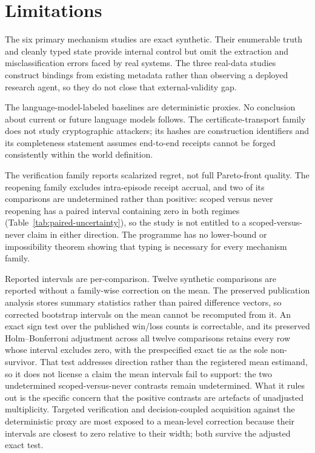 \section{Limitations}

The six primary mechanism studies are exact synthetic. Their enumerable truth and cleanly typed state provide internal control but omit the extraction and misclassification errors faced by real systems. The three real-data studies construct bindings from existing metadata rather than observing a deployed research agent, so they do not close that external-validity gap.

The language-model-labeled baselines are deterministic proxies. No conclusion about current or future language models follows. The certificate-transport family does not study cryptographic attackers; its hashes are construction identifiers and its completeness statement assumes end-to-end receipts cannot be forged consistently within the world definition.

The verification family reports scalarized regret, not full Pareto-front quality. The reopening family excludes intra-episode receipt accrual, and two of its comparisons are undetermined rather than positive: scoped versus never reopening has a paired interval containing zero in both regimes (Table~\ref{tab:paired-uncertainty}), so the study is not entitled to a scoped-versus-never claim in either direction. The programme has no lower-bound or impossibility theorem showing that typing is necessary for every mechanism family.

Reported intervals are per-comparison. Twelve synthetic comparisons are reported without a family-wise correction on the mean. The preserved publication analysis stores summary statistics rather than paired difference vectors, so corrected bootstrap intervals on the mean cannot be recomputed from it. An exact sign test over the published win/loss counts is correctable, and its preserved Holm--Bonferroni adjustment across all twelve comparisons retains every row whose interval excludes zero, with the prespecified exact tie as the sole non-survivor. That test addresses direction rather than the registered mean estimand, so it does not license a claim the mean intervals fail to support: the two undetermined scoped-versus-never contrasts remain undetermined. What it rules out is the specific concern that the positive contrasts are artefacts of unadjusted multiplicity. Targeted verification and decision-coupled acquisition against the deterministic proxy are most exposed to a mean-level correction because their intervals are closest to zero relative to their width; both survive the adjusted exact test.

